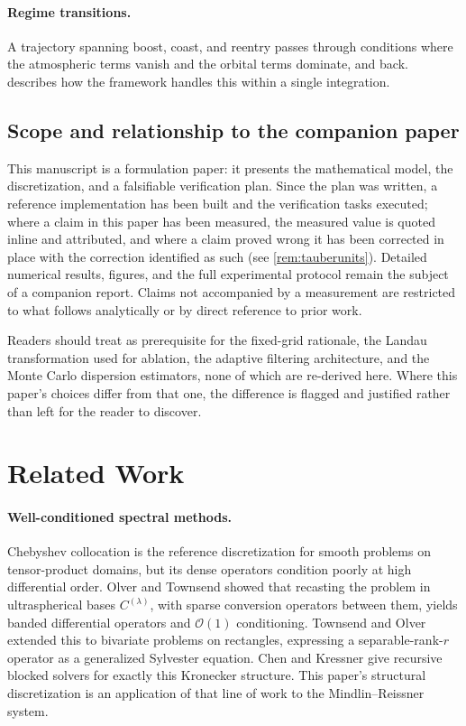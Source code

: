\documentclass[11pt,a4paper]{article}
\theoremstyle{definition}
\numberwithin{equation}{section}
\begin{document}
\paragraph{Regime transitions.} A trajectory spanning boost, coast, and reentry passes through conditions where the atmospheric terms vanish and the orbital terms dominate, and back.  describes how the framework handles this within a single integration.

\subsection{Scope and relationship to the companion paper}
\label{sec:scope}

This manuscript is a formulation paper: it presents the mathematical model, the discretization, and a falsifiable verification plan. Since the plan was written, a reference implementation has been built and the verification tasks executed; where a claim in this paper has been measured, the measured value is quoted inline and attributed, and where a claim proved wrong it has been corrected in place with the correction identified as such (see \cref{rem:tauberunits}). Detailed numerical results, figures, and the full experimental protocol remain the subject of a companion report. Claims not accompanied by a measurement are restricted to what follows analytically or by direct reference to prior work.

Readers should treat \cite{knox2026passes} as prerequisite for the fixed-grid rationale, the Landau transformation used for ablation, the adaptive filtering architecture, and the Monte Carlo dispersion estimators, none of which are re-derived here. Where this paper's choices differ from that one, the difference is flagged and justified rather than left for the reader to discover.

\section{Related Work}
\label{sec:related}

\paragraph{Well-conditioned spectral methods.} Chebyshev collocation \cite{trefethen2000} is the reference discretization for smooth problems on tensor-product domains, but its dense operators condition poorly at high differential order. Olver and Townsend \cite{olver2013} showed that recasting the problem in ultraspherical bases $C^{(\lambda)}$, with sparse conversion operators between them, yields banded differential operators and $\mathcal{O}(1)$ conditioning. Townsend and Olver \cite{townsend2015} extended this to bivariate problems on rectangles, expressing a separable-rank-$r$ operator as a generalized Sylvester equation. Chen and Kressner \cite{chen2020} give recursive blocked solvers for exactly this Kronecker structure. This paper's structural discretization is an application of that line of work to the Mindlin--Reissner system.
\end{document}
